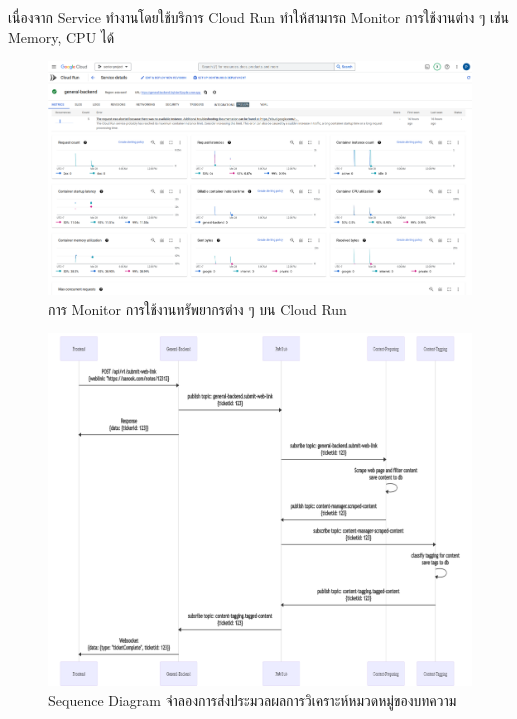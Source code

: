 \documentclass[12pt,oneside,openright,a4paper]{cpe-thai-project}
\begin{document}
\begin{itemize}
  \hspace{1cm}เนื่องจาก Service ทำงานโดยใช้บริการ Cloud Run ทำให้สามารถ Monitor การใช้งานต่าง ๆ เช่น Memory, CPU ได้ 
  \begin{figure}[!ht]\centering
    \includegraphics[width=\textwidth]{./img/monitor.png}
    \caption{การ Monitor การใช้งานทรัพยากรต่าง ๆ บน Cloud Run}\label{fig:monitor}
  \end{figure}
  \newpage    
  \begin{figure}[!ht]\centering
    \includegraphics[width=\textwidth]{./img/request_process_flow.png}
    \caption{Sequence Diagram จำลองการส่งประมวลผลการวิเคราะห์หมวดหมู่ของบทความ}\label{fig:req_proc} 
  \end{figure}
  

\end{itemize}
\end{document}
